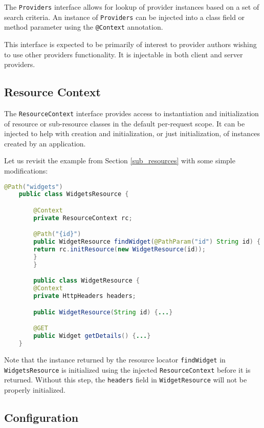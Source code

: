 The \lstinline{Providers} interface allows for lookup of provider instances based on a set of search criteria. An
instance of \lstinline{Providers} can be injected into a class field or method parameter using the \lstinline{@Context}
annotation.

This interface is expected to be primarily of interest to provider authors wishing to use other providers functionality.
It is injectable in both client and server providers.

\subsection{Resource Context}
\label{resource_context}

The \lstinline{ResourceContext} interface provides access to instantiation and initialization of resource or
sub-resource classes in the default per-request scope. It can be injected to help with creation and initialization, or
just initialization, of instances created by an application.

Let us revisit the example from Section \ref{sub_resources} with some simple modifications:

\begin{lstlisting}[language=Java]
    @Path("widgets")
    public class WidgetsResource {

        @Context
        private ResourceContext rc;

        @Path("{id}")
        public WidgetResource findWidget(@PathParam("id") String id) {
        return rc.initResource(new WidgetResource(id));
        }
        }

        public class WidgetResource {
        @Context
        private HttpHeaders headers;

        public WidgetResource(String id) {...}

        @GET
        public Widget getDetails() {...}
    }
\end{lstlisting}

Note that the instance returned by the resource locator \lstinline{findWidget} in \lstinline{WidgetsResource} is
initialized using the injected \lstinline{ResourceContext} before it is returned. Without this step, the
\lstinline{headers} field in \lstinline{WidgetResource} will not be properly initialized.

\subsection{Configuration}
\label{configuration_injection}

